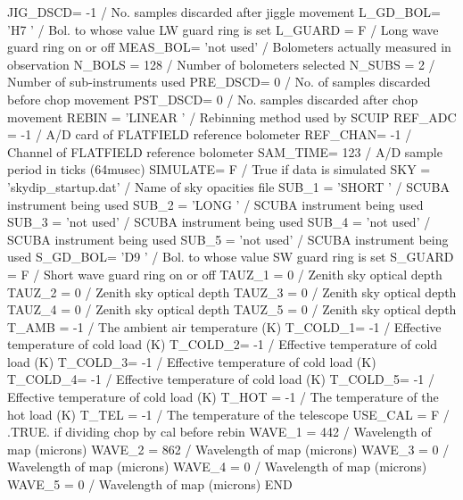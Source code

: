 \documentclass[twoside,11pt]{starlink}
\begin{document}
\begin{terminalv}
JIG_DSCD=                   -1 / No. samples discarded after jiggle movement
L_GD_BOL= 'H7      '           / Bol. to whose value LW guard ring is set
L_GUARD =                    F / Long wave guard ring on or off
MEAS_BOL= 'not used'           / Bolometers  actually measured in observation
N_BOLS  =                  128 / Number of bolometers selected
N_SUBS  =                    2 / Number of sub-instruments used
PRE_DSCD=                    0 / No. of samples discarded before chop movement
PST_DSCD=                    0 / No. samples discarded after chop movement
REBIN   = 'LINEAR  '           / Rebinning method used by SCUIP
REF_ADC =                   -1 / A/D card of FLATFIELD reference bolometer
REF_CHAN=                   -1 / Channel of FLATFIELD reference bolometer
SAM_TIME=                  123 / A/D sample period in ticks (64musec)
SIMULATE=                    F / True if data is simulated
SKY     = 'skydip_startup.dat' / Name of sky opacities file
SUB_1   = 'SHORT   '           / SCUBA instrument being used
SUB_2   = 'LONG    '           / SCUBA instrument being used
SUB_3   = 'not used'           / SCUBA instrument being used
SUB_4   = 'not used'           / SCUBA instrument being used
SUB_5   = 'not used'           / SCUBA instrument being used
S_GD_BOL= 'D9      '           / Bol. to whose value SW guard ring is set
S_GUARD =                    F / Short wave guard ring on or off
TAUZ_1  =                    0 / Zenith sky optical depth
TAUZ_2  =                    0 / Zenith sky optical depth
TAUZ_3  =                    0 / Zenith sky optical depth
TAUZ_4  =                    0 / Zenith sky optical depth
TAUZ_5  =                    0 / Zenith sky optical depth
T_AMB   =                   -1 / The ambient air temperature (K)
T_COLD_1=                   -1 / Effective temperature of cold load (K)
T_COLD_2=                   -1 / Effective temperature of cold load (K)
T_COLD_3=                   -1 / Effective temperature of cold load (K)
T_COLD_4=                   -1 / Effective temperature of cold load (K)
T_COLD_5=                   -1 / Effective temperature of cold load (K)
T_HOT   =                   -1 / The temperature of the hot load (K)
T_TEL   =                   -1 / The temperature of the telescope
USE_CAL =                    F / .TRUE. if dividing chop by cal before rebin
WAVE_1  =                  442 / Wavelength of map (microns)
WAVE_2  =                  862 / Wavelength of map (microns)
WAVE_3  =                    0 / Wavelength of map (microns)
WAVE_4  =                    0 / Wavelength of map (microns)
WAVE_5  =                    0 / Wavelength of map (microns)
END
\end{terminalv}
\end{document}

